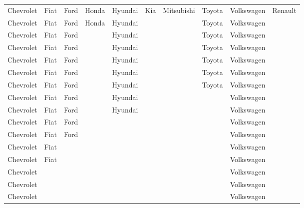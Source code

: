 \documentclass[
	12pt,				%
	oneside,			%
	a4paper,			%
	english,			%
	french,				%
	spanish,			%
	brazil,				%
	]{abntex2}
\begin{document}
\begin{center}
\begin{table}[H]
\begin{center}
\begin{tabular}{llllllllll}


Chevrolet & Fiat & Ford & Honda & Hyundai & Kia & Mitsubishi & Toyota & Volkswagen & Renault \\ 

Chevrolet & Fiat & Ford & Honda & Hyundai &  &  & Toyota & Volkswagen &  \\

Chevrolet & Fiat & Ford &  & Hyundai &  &  & Toyota & Volkswagen &  \\ 

Chevrolet & Fiat & Ford &  & Hyundai &  &  & Toyota & Volkswagen &  \\

Chevrolet & Fiat & Ford &  & Hyundai &  &  & Toyota & Volkswagen &  \\ 

Chevrolet & Fiat & Ford &  & Hyundai &  &  & Toyota & Volkswagen &  \\

Chevrolet & Fiat & Ford &  & Hyundai &  &  & Toyota & Volkswagen &  \\ 

Chevrolet & Fiat & Ford &  & Hyundai &  &  &  & Volkswagen &  \\

Chevrolet & Fiat & Ford &  & Hyundai &  &  &  & Volkswagen &  \\ 

Chevrolet & Fiat & Ford &  &  &  &  &  & Volkswagen &  \\

Chevrolet & Fiat & Ford &  &  &  &  &  & Volkswagen &  \\ 

Chevrolet & Fiat &  &  &  &  &  &  & Volkswagen &  \\

Chevrolet & Fiat &  &  &  &  &  &  & Volkswagen &  \\ 

Chevrolet &  &  &  &  &  &  &  & Volkswagen &  \\

Chevrolet &  &  &  &  &  &  &  & Volkswagen &  \\ 

Chevrolet &  &  &  &  &  &  &  & Volkswagen &  \\


\end{tabular}
\end{center}
\end{table}
\end{center}
\end{document}
